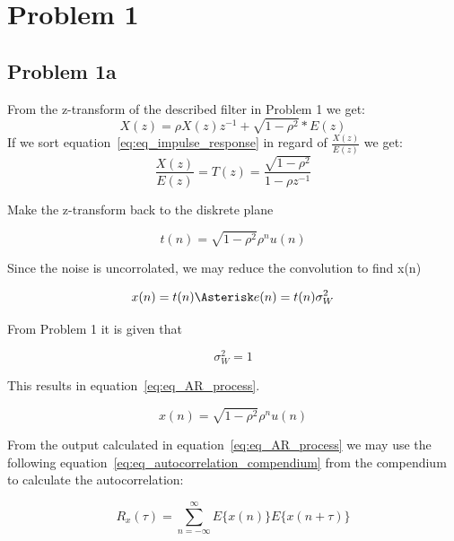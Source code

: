 \chapter{Problem 1}
  \section{Problem 1a}
	
	From the z-transform of the described filter in Problem 1 we get:
	\begin{equation}
		X(z)=\rho X(z)z^{-1}+\sqrt{1-\rho ^2}*E(z) 
		\label{eq:eq_impulse_response}
	\end{equation}
	If we sort equation~\ref{eq:eq_impulse_response} in regard of $\frac{X(z)}{E(z)}$ we get:
	\begin{equation*}
		\frac{X(z)}{E(z)}=T(z)=\frac{\sqrt{1-\rho ^2}}{1-\rho z^{-1}}	
		\label{eq:eq_freq_resp_x}
	\end{equation*}
	
	Make the z-transform back to the diskrete plane
	
	\begin{equation*}
		t(n)=\sqrt{1-\rho ^2}\rho ^nu(n)
	\end{equation*}
	
	Since the noise is uncorrolated, we may reduce the convolution to find x(n)
	
	\begin{equation*}
		x(n)=t(n)\Asterisk e(n)=t(n)\sigma ^2_W
	\end{equation*}
	
	From Problem 1 it is given that
	
	\begin{equation*}
		\sigma ^2_W=1
	\end{equation*}
	
	This results in equation~\ref{eq:eq_AR_process}.
	
	\begin{equation}
		x(n)=\sqrt{1-\rho ^2}\rho ^nu(n)
		\label{eq:eq_AR_process}
	\end{equation}
	
	From the output calculated in equation~\ref{eq:eq_AR_process} we may use the following equation~\ref{eq:eq_autocorrelation_compendium} from the compendium to calculate the autocorrelation:
	
	\begin{equation}
		R_x(\tau)=\sum_{n=-\infty}^{\infty}E\{x(n)\}E\{x(n+\tau)\}
		\label{eq:eq_autocorrelation_compendium}
	\end{equation}
	
